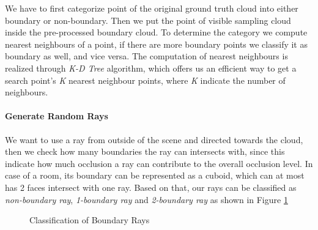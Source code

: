 \documentclass[11pt, a4paper,oneside,chapterprefix=false]{scrbook}
\begin{document}
We have to first categorize point of the original ground truth cloud into either boundary or non-boundary. 
Then we put the point of visible sampling cloud inside the pre-processed boundary cloud. To determine the category we compute nearest neighbours of a point, if there are more boundary points we classify it as boundary as well, and vice versa. The computation of nearest neighbours is realized through \textit{K-D Tree} algorithm, which offers us an efficient way to get a search point's \textit{K} nearest neighbour points, where \textit{K} indicate the number of neighbours.


\paragraph{Generate Random Rays}

We want to use a ray from outside of the scene and directed towards the cloud, then we check how many boundaries the ray can intersects with, since this indicate how much occlusion a ray can contribute to the overall occlusion level. In case of a room, its boundary can be represented as a cuboid, which can at most has 2 faces intersect with one ray. Based on that, our rays can be classified as \textit{non-boundary ray}, \textit{1-boundary ray} and \textit{2-boundary ray} as shown in Figure \ref{classification of bound ray}

\begin{figure}[H]
    \centering
     \label{fig:non-bound ray}
     \label{fig:1-bound ray}
      \label{fig:2-bounds ray} 
    \caption{Classification of Boundary Rays}
    \label{classification of bound ray}
\end{figure}
\end{document}
